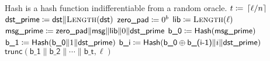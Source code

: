\begin{algorithm}[t]
\caption{\ExpandMsgXmd{}}
\label{alg:expand_message_xmd}
\begin{algorithmic}[1]
\Require \textsf{Hash} is a hash function indifferentiable from a random oracle.
    \State $t \coloneqq{} \left\lceil \ell/n \right\rceil$
    \State $\textsf{dst\_prime} \coloneqq{} \textsf{dst} \|
            \textsc{Length}(\textsf{dst})$
    \State $\textsf{zero\_pad} \coloneqq{} 0^{b}$
    \State $\textsf{lib} \coloneqq{}
        \textsc{Length}(\ell)$
    \State $\textsf{msg\_prime} \coloneqq{} 
        \textsf{zero\_pad}\|
        \textsf{msg}\|
        \textsf{lib}\|0\|
        \textsf{dst\_prime}$
    \State $\textsf{b\_0} \coloneqq{} 
        \textsf{Hash}(\textsf{msg\_prime})$
    \State $\textsf{b\_1} \coloneqq{} 
        \textsf{Hash}(\textsf{b\_0}\|1\|\textsf{dst\_prime})$
        \State $\textsf{b\_i} \coloneqq{} 
            \textsf{Hash}(\textsf{b\_0}\oplus\textsf{b\_(i-1)}\|i\|
            \textsf{dst\_prime})$
    \EndFor
    \State \Return $\textsf{trunc}(
        \textsf{b\_1}\|\textsf{b\_2}\|\cdots\|\textsf{b\_t}, \ell)$
\EndProcedure
\end{algorithmic}
\end{algorithm}
